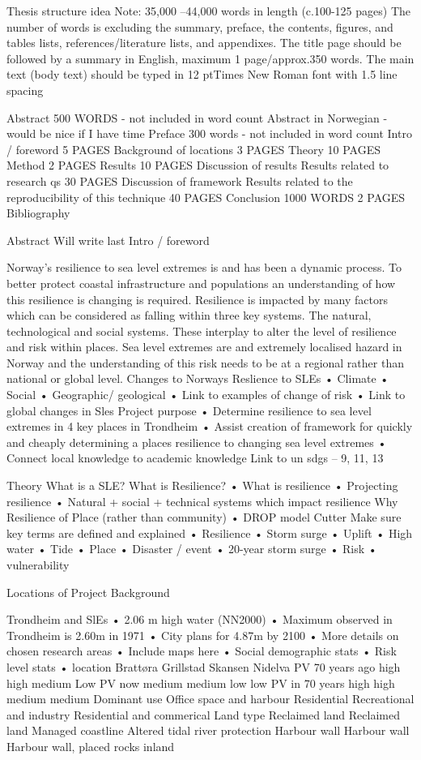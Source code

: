 Thesis structure idea 
Note: 35,000 –44,000 words in length (c.100-125 pages) 
The number of words is excluding the summary, preface, the contents, figures, and tables lists, references/literature lists, and appendixes. The title page should be followed by a summary in English, maximum 1 page/approx.350 words. 
The main text (body text) should be typed in 12 ptTimes New Roman font with 1.5 line 
spacing

Abstract
500 WORDS  - not included in word count
Abstract in Norwegian - would be nice if I have time
Preface
300 words - not included in word count
Intro / foreword 
5 PAGES
Background of locations
3 PAGES
Theory
10 PAGES
Method
2 PAGES
Results
10 PAGES 
Discussion of results
Results related to research qs
30 PAGES
Discussion of framework 
Results related to the reproducibility of this technique
40 PAGES 
Conclusion 
1000 WORDS 2 PAGES
Bibliography

Abstract
Will write last
Intro / foreword

Norway’s resilience to sea level extremes is and has been a dynamic process. To better protect coastal infrastructure and populations an understanding of how this resilience is changing is required. Resilience is impacted by many factors which can be considered as falling within three key systems. The natural, technological and social systems. These interplay to alter the level of resilience and risk within places. Sea level extremes are and extremely localised hazard in Norway and the understanding of this risk needs to be at a regional rather than national or global level. 
Changes to Norways Reslience to SLEs
•	Climate
•	Social 
•	Geographic/ geological
•	Link to examples of change of risk
•	Link to global changes in Sles
Project purpose
•	Determine resilience to sea level extremes in 4 key places in Trondheim
•	Assist creation of framework for quickly and cheaply determining a places resilience to changing sea level extremes
•	Connect local knowledge to academic knowledge
Link to un sdgs – 9, 11, 13

Theory
What is a SLE?
What is Resilience?
•	What is resilience
•	Projecting resilience
•	Natural + social + technical systems which impact resilience
Why Resilience of Place (rather than community)
•	DROP model Cutter
Make sure key terms are defined and explained
•	Resilience
•	Storm surge
•	Uplift
•	High water
•	Tide
•	Place
•	Disaster / event
•	20-year storm surge
•	Risk
•	vulnerability

Locations of Project Background

Trondheim and SlEs
•	2.06 m high water (NN2000)
•	Maximum observed in Trondheim is 2.60m in 1971
•	City plans for 4.87m by 2100
•	More details on chosen research areas
•	Include maps here 
•	Social demographic stats
•	Risk level stats
•	
location	Brattøra	Grillstad	Skansen 	Nidelva
PV 70 years ago	high	high	medium	Low
PV now	 medium	 medium	 low	 low
PV in 70 years	 high	 high	 medium	 medium
Dominant use	Office space and harbour	Residential	Recreational and industry	Residential and commerical
Land type	Reclaimed land	Reclaimed land	Managed coastline 	Altered tidal river
protection	Harbour wall	Harbour wall	Harbour wall, placed rocks	inland
 	 	 	 	 

